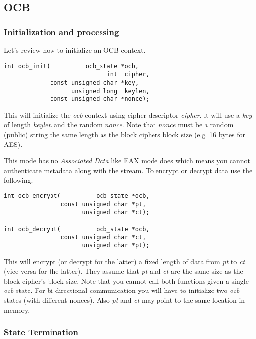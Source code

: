 \documentclass[synpaper]{book}
\begin{document}
\subsection{OCB}
\subsubsection{Initialization and processing}

Let's review how to initialize an OCB context.

\begin{verbatim}
int ocb_init(          ocb_state *ocb,
                             int  cipher,
             const unsigned char *key,
                   unsigned long  keylen,
             const unsigned char *nonce);
\end{verbatim}

This will initialize the \textit{ocb} context using cipher descriptor \textit{cipher}.  It will use a \textit{key} of length \textit{keylen}
and the random \textit{nonce}.  Note that \textit{nonce} must be a random (public) string the same length as the block ciphers
block size (e.g. 16 bytes for AES).

This mode has no \textit{Associated Data} like EAX mode does which means you cannot authenticate metadata along with the stream.
To encrypt or decrypt data use the following.

 
\begin{verbatim}
int ocb_encrypt(          ocb_state *ocb,
                const unsigned char *pt,
                      unsigned char *ct);

int ocb_decrypt(          ocb_state *ocb,
                const unsigned char *ct,
                      unsigned char *pt);
\end{verbatim}

This will encrypt (or decrypt for the latter) a fixed length of data from \textit{pt} to \textit{ct} (vice versa for the latter).
They assume that \textit{pt} and \textit{ct} are the same size as the block cipher's block size.  Note that you cannot call
both functions given a single \textit{ocb} state.  For bi-directional communication you will have to initialize two \textit{ocb}
states (with different nonces).  Also \textit{pt} and \textit{ct} may point to the same location in memory.

\subsubsection{State Termination}
\end{document}
